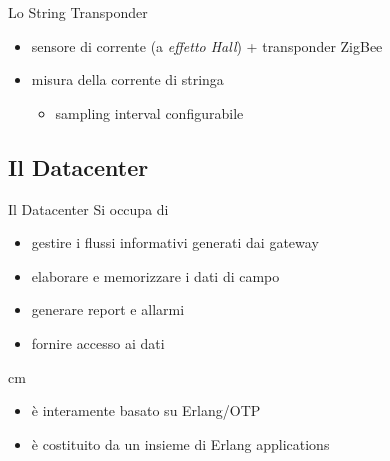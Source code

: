 \documentclass{beamer}
\newcommand{\N}{\vskip 0.3 cm}
\newcommand{\red}[1]{\textcolor[rgb]{.8,0,0}{#1}}
\newcommand{\green}[1]{\textcolor[rgb]{0,.6,.1}{#1}}
\begin{document}
%
\begin{frame}{Lo String Transponder}
\begin{figure}[!h]
  \begin{center}
  \end{center}
\end{figure}
%
\begin{itemize}
\item \red{sensore di corrente} (a \emph{effetto Hall}) + \red{transponder ZigBee}
\item misura della corrente di stringa
  \begin{itemize}
  \item \red{sampling interval} configurabile  
  \end{itemize}
  \end{itemize}
\end{frame}
%

%
\subsection{Il Datacenter}
%
\begin{frame}{Il Datacenter}
Si occupa di
\begin{itemize}
\item \green{gestire i flussi informativi} generati dai gateway
\item \green{elaborare} e \green{memorizzare} i dati di campo 
\item generare \green{report} e \green{allarmi}
\item fornire \green{accesso ai dati}
\end{itemize}
%
\N
\begin{itemize}
  \item \`e interamente basato su \red{Erlang/OTP}
  \item \`e costituito da un insieme di \red{Erlang applications}
\end{itemize}
%
\begin{figure}[!h]
  \begin{center}
  \end{center}
\end{figure}
%
\end{frame}
%
\end{document}
